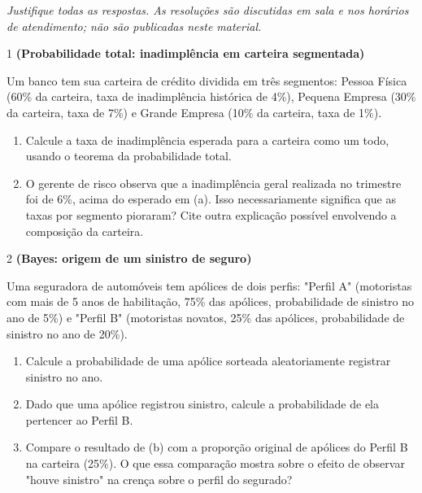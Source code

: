 \documentclass[11pt]{article}
\begin{document}

\noindent \textit{Justifique todas as respostas. As resoluções são discutidas em sala e nos horários de atendimento; não são publicadas neste material.}

\begin{questao}{1} \textbf{(Probabilidade total: inadimplência em carteira segmentada)}

Um banco tem sua carteira de crédito dividida em três segmentos: Pessoa Física (60\% da carteira,
taxa de inadimplência histórica de 4\%), Pequena Empresa (30\% da carteira, taxa de 7\%) e Grande
Empresa (10\% da carteira, taxa de 1\%).

\begin{enumerate}[label=(\alph*)]
  \item Calcule a taxa de inadimplência esperada para a carteira como um todo, usando o teorema da
    probabilidade total.
  \item O gerente de risco observa que a inadimplência geral realizada no trimestre foi de 6\%,
    acima do esperado em (a). Isso necessariamente significa que as taxas por segmento pioraram?
    Cite outra explicação possível envolvendo a composição da carteira.
\end{enumerate}
\end{questao}

\begin{questao}{2} \textbf{(Bayes: origem de um sinistro de seguro)}

Uma seguradora de automóveis tem apólices de dois perfis: "Perfil A" (motoristas com mais de 5
anos de habilitação, 75\% das apólices, probabilidade de sinistro no ano de 5\%) e "Perfil B"
(motoristas novatos, 25\% das apólices, probabilidade de sinistro no ano de 20\%).

\begin{enumerate}[label=(\alph*)]
  \item Calcule a probabilidade de uma apólice sorteada aleatoriamente registrar sinistro no ano.
  \item Dado que uma apólice registrou sinistro, calcule a probabilidade de ela pertencer ao
    Perfil B.
  \item Compare o resultado de (b) com a proporção original de apólices do Perfil B na carteira
    (25\%). O que essa comparação mostra sobre o efeito de observar "houve sinistro" na crença
    sobre o perfil do segurado?
\end{enumerate}
\end{questao}
\end{document}
